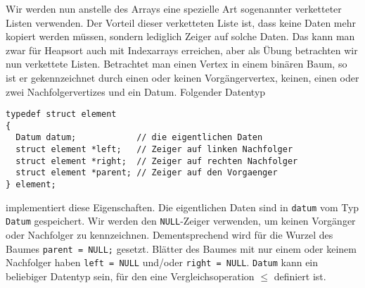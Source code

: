 \documentclass[tikz,12pt]{article}
\begin{document}
Wir werden nun anstelle des Arrays eine spezielle Art sogenannter verketteter Listen verwenden.
Der Vorteil dieser verketteten Liste ist, dass keine Daten mehr kopiert werden müssen, sondern lediglich Zeiger auf solche Daten.
Das kann man zwar für Heapsort auch mit Indexarrays erreichen, aber als Übung betrachten wir nun verkettete Listen.
Betrachtet man einen Vertex in einem binären Baum, so ist er gekennzeichnet durch einen oder keinen Vorgängervertex, keinen, einen oder zwei Nachfolgervertizes und ein Datum.
Folgender Datentyp 
\begin{lstlisting}
typedef struct element
{
  Datum datum;            // die eigentlichen Daten
  struct element *left;   // Zeiger auf linken Nachfolger
  struct element *right;  // Zeiger auf rechten Nachfolger
  struct element *parent; // Zeiger auf den Vorgaenger
} element;
\end{lstlisting}
implementiert diese Eigenschaften.
Die eigentlichen Daten sind in \texttt{datum} vom Typ \texttt{Datum} gespeichert.
Wir werden den \texttt{NULL}-Zeiger verwenden, um keinen Vorgänger oder Nachfolger zu kennzeichnen.
Dementsprechend wird für die Wurzel des Baumes \texttt{parent = NULL;} gesetzt.
Blätter des Baumes mit nur einem oder keinem Nachfolger haben \texttt{left = NULL} und/oder \texttt{right = NULL}.
\texttt{Datum} kann ein beliebiger Datentyp sein, für den eine Vergleichsoperation $\leq$ definiert ist.
\end{document}
